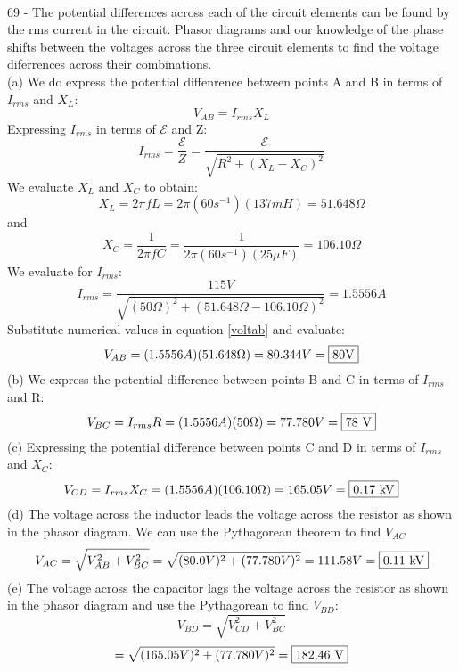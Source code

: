 \documentclass{report}
\begin{document}
\paragraph{}
69 - The potential differences across each of the circuit elements can be found by the rms current in the circuit. Phasor diagrams and our knowledge of the phase shifts between the voltages across the three circuit elements to find the voltage diferrences across their combinations.\\
(a) We do express the potential diffenrence between points A and B in terms of $I_{rms}$ and $X_L$:
\begin{equation}\label{voltab}
  V_{AB} = I_{rms}X_L
\end{equation}
Expressing $I_{rms}$ in terms of $\mathcal{E}$ and Z:
$$I_{rms} = \frac{\mathcal{E}}{Z} = \frac{\mathcal{E}}{\sqrt{R^2 + (X_L - X_C)^2}}$$
We evaluate $X_L$ and $X_C$ to obtain:
$$X_L = 2 \pi fL = 2 \pi (60s^{-1})(137 mH) = 51.648 \Omega$$
and
$$X_C = \frac{1}{2 \pi fC} = \frac{1}{2 \pi (60s^{-1})(25 \mu F)} = 106.10 \Omega$$
We evaluate for $I_{rms}$:
$$I_{rms} = \frac{115 V}{\sqrt{(50 \Omega)^2 + (51.648 \Omega - 106.10 \Omega)^2}} = 1.5556 A$$
Substitute numerical values in equation \ref{voltab} and evaluate:
$$V_{AB} = (1.5556 A)(51.648 \Omega) = 80.344 V = \fbox{80V}$$
(b) We express the potential difference between points B and C in terms of $I_{rms}$ and R:
$$V_{BC} = I_{rms}R = (1.5556 A)(50 \Omega) = 77.780 V = \fbox{78 V}$$
(c) Expressing the potential difference between points C and D in terms of $I_{rms}$ and $X_C$:
$$V_{CD} = I_{rms}X_C = (1.5556 A)(106.10 \Omega) = 165.05 V = \fbox{0.17 kV}$$
(d) The voltage across the inductor leads the voltage across the resistor as shown in the phasor diagram. We can use the Pythagorean theorem to find $V_{AC}$
$$V_{AC} = \sqrt{V_{AB}^2 + V_{BC}^2} = \sqrt{(80.0 V)^2 + (77.780 V)^2} = 111.58 V = \fbox{0.11 kV}$$
(e) The voltage across the capacitor lags the voltage across the resistor as shown in the phasor diagram and use the Pythagorean to find $V_{BD}$:
$$V_{BD} = \sqrt{V_{CD}^2 + V_{BC}^2}$$
$$= \sqrt{(165.05 V)^2 + (77.780 V)^2} = \fbox{182.46 V}$$
\end{document}
